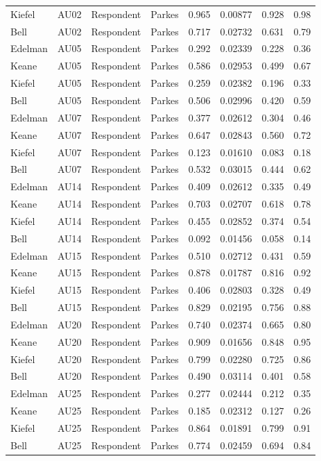 \documentclass{monashthesis}
\begin{document}
\begin{center}
\begin{longtable}{llllllll}
Kiefel & AU02 & Respondent & Parkes & 0.965 & 0.00877 & 0.928 & 0.98 \\
Bell & AU02 & Respondent & Parkes & 0.717 & 0.02732 & 0.631 & 0.79 \\
Edelman & AU05 & Respondent & Parkes & 0.292 & 0.02339 & 0.228 & 0.36 \\
Keane & AU05 & Respondent & Parkes & 0.586 & 0.02953 & 0.499 & 0.67 \\
Kiefel & AU05 & Respondent & Parkes & 0.259 & 0.02382 & 0.196 & 0.33 \\
Bell & AU05 & Respondent & Parkes & 0.506 & 0.02996 & 0.420 & 0.59 \\
Edelman & AU07 & Respondent & Parkes & 0.377 & 0.02612 & 0.304 & 0.46 \\
Keane & AU07 & Respondent & Parkes & 0.647 & 0.02843 & 0.560 & 0.72 \\
Kiefel & AU07 & Respondent & Parkes & 0.123 & 0.01610 & 0.083 & 0.18 \\
Bell & AU07 & Respondent & Parkes & 0.532 & 0.03015 & 0.444 & 0.62 \\
Edelman & AU14 & Respondent & Parkes & 0.409 & 0.02612 & 0.335 & 0.49 \\
Keane & AU14 & Respondent & Parkes & 0.703 & 0.02707 & 0.618 & 0.78 \\
Kiefel & AU14 & Respondent & Parkes & 0.455 & 0.02852 & 0.374 & 0.54 \\
Bell & AU14 & Respondent & Parkes & 0.092 & 0.01456 & 0.058 & 0.14 \\
Edelman & AU15 & Respondent & Parkes & 0.510 & 0.02712 & 0.431 & 0.59 \\
Keane & AU15 & Respondent & Parkes & 0.878 & 0.01787 & 0.816 & 0.92 \\
Kiefel & AU15 & Respondent & Parkes & 0.406 & 0.02803 & 0.328 & 0.49 \\
Bell & AU15 & Respondent & Parkes & 0.829 & 0.02195 & 0.756 & 0.88 \\
Edelman & AU20 & Respondent & Parkes & 0.740 & 0.02374 & 0.665 & 0.80 \\
Keane & AU20 & Respondent & Parkes & 0.909 & 0.01656 & 0.848 & 0.95 \\
Kiefel & AU20 & Respondent & Parkes & 0.799 & 0.02280 & 0.725 & 0.86 \\
Bell & AU20 & Respondent & Parkes & 0.490 & 0.03114 & 0.401 & 0.58 \\
Edelman & AU25 & Respondent & Parkes & 0.277 & 0.02444 & 0.212 & 0.35 \\
Keane & AU25 & Respondent & Parkes & 0.185 & 0.02312 & 0.127 & 0.26 \\
Kiefel & AU25 & Respondent & Parkes & 0.864 & 0.01891 & 0.799 & 0.91 \\
Bell & AU25 & Respondent & Parkes & 0.774 & 0.02459 & 0.694 & 0.84 \\
\end{longtable}
\end{center}
\end{document}
